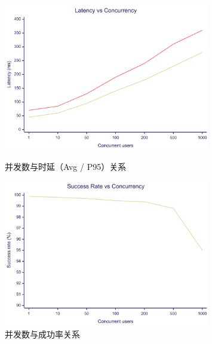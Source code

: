 \begin{figure}[H]
  \centering
  \begin{minipage}{0.48\textwidth}
    \centering
    \includegraphics[width=0.8\textwidth]{chapters/fig-0/performance-latency.png}
    \caption{并发数与时延（Avg / P95）关系}
    \label{fig:perf-latency}
  \end{minipage}
  \hfill
  \begin{minipage}{0.48\textwidth}
    \centering
    \includegraphics[width=0.8\textwidth]{chapters/fig-0/performance-success.png}
    \caption{并发数与成功率关系}
    \label{fig:perf-success}
  \end{minipage}

  \vspace{1em}


\end{figure}
